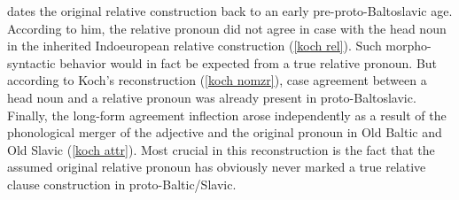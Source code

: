 \citet[468, 470]{koch1999} dates the original relative construction back to an early pre-proto-Baltoslavic age. According to him, the relative pronoun did not agree in case with the head noun in the inherited Indoeuropean relative construction (\ref{koch rel}). Such morpho-syntactic behavior would in fact be expected from a true relative pronoun. But according to Koch's reconstruction (\ref{koch nomzr}), case agreement between a head noun and a relative pronoun was already present in proto-Baltoslavic. Finally, the long-form agreement inflection arose independently as a result of the phonological merger of the adjective and the original pronoun in Old Baltic and Old Slavic (\ref{koch attr}). Most crucial in this reconstruction is the fact that the assumed original relative pronoun has obviously never marked a true relative clause construction in proto-Baltic/Slavic.

